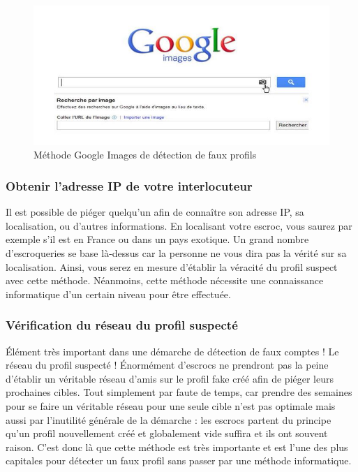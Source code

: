 \documentclass[12pt]{report}
\begin{document}
\begin{figure}[h]
\begin{center}
    \includegraphics[width=150mm]{google-image-recherche.jpg}
    \end{center}
    \caption{Méthode Google Images de détection de faux profils}
\label{fig:Méthode Google Images de détection de faux profils}
  \end{figure}

\subsubsection{Obtenir l’adresse IP de votre interlocuteur}
Il est possible de piéger quelqu'un afin de connaître son adresse IP, sa localisation, ou d'autres informations. En localisant votre escroc, vous saurez par exemple s’il est en France ou dans un pays exotique. Un grand nombre d'escroqueries se base là-dessus car la personne ne vous dira pas la vérité sur sa localisation. Ainsi, vous serez en mesure d'établir la véracité du profil suspect avec cette méthode. Néanmoins, cette méthode nécessite une connaissance informatique d'un certain niveau pour être effectuée. 

\subsubsection{Vérification du réseau du profil suspecté}
Élément très important dans une démarche de détection de faux comptes ! Le réseau du profil suspecté ! Énormément d'escrocs ne prendront pas la peine d'établir un véritable réseau d'amis sur le profil fake créé afin de piéger leurs prochaines cibles. Tout simplement par faute de temps, car prendre des semaines pour se faire un véritable réseau pour une seule cible n'est pas optimale mais aussi par l'inutilité générale de la démarche : les escrocs partent du principe qu'un profil nouvellement créé et globalement vide suffira et ils ont souvent raison. C'est donc là que cette méthode est très importante et est l'une des plus capitales pour détecter un faux profil sans passer par une méthode informatique.\\
\end{document}
